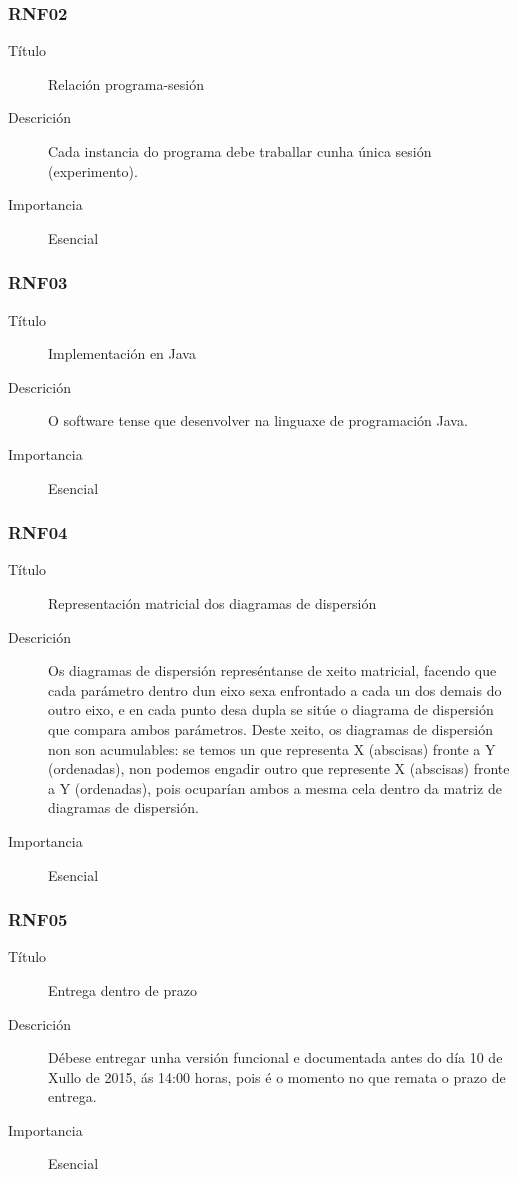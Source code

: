 \subsubsection*{RNF02}
\begin{description}
\item[Título] \hfill
Relación programa-sesión
\item[Descrición] \hfill
Cada instancia do programa debe traballar cunha única sesión (experimento).
\item[Importancia] \hfill
Esencial
\end{description}

\subsubsection*{RNF03}
\begin{description}
\item[Título] \hfill
Implementación en Java
\item[Descrición] \hfill
O software tense que desenvolver na linguaxe de programación Java.
\item[Importancia] \hfill
Esencial
\end{description}

\subsubsection*{RNF04}
\begin{description}
\item[Título] \hfill
Representación matricial dos diagramas de dispersión
\item[Descrición] \hfill
Os diagramas de dispersión represéntanse de xeito matricial, facendo que cada parámetro dentro dun eixo sexa enfrontado a cada un dos demais do outro eixo, e en cada punto desa dupla se sitúe o diagrama de dispersión que compara ambos parámetros. Deste xeito, os diagramas de dispersión non son acumulables: se temos un que representa X (abscisas) fronte a Y (ordenadas), non podemos engadir outro que represente X (abscisas) fronte a Y (ordenadas), pois ocuparían ambos a mesma cela dentro da matriz de diagramas de dispersión.
\item[Importancia] \hfill
Esencial
\end{description}

\subsubsection*{RNF05}
\begin{description}
\item[Título] \hfill
Entrega dentro de prazo
\item[Descrición] \hfill
Débese entregar unha versión funcional e documentada antes do día 10 de Xullo de 2015, ás 14:00 horas, pois é o momento no que remata o prazo de entrega.
\item[Importancia] \hfill
Esencial
\end{description}

